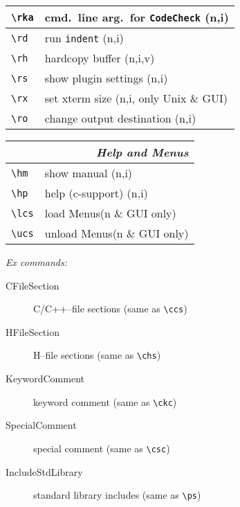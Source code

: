 \documentclass[oneside,11pt,landscape,DIV16]{scrartcl}
\begin{document}
\begin{multicols}{3}
\begin{center}
\begin{tabular}[]{|p{12mm}|p{62mm}|}
\hline \verb'\rka' & cmd.\ line arg.\ for \texttt{CodeCheck} \hfill (n,i)\\
%
\hline \verb'\rd'  & run \texttt{indent}         \hfill (n,i)\\
\hline \verb'\rh'  & hardcopy buffer             \hfill (n,i,v)\\
\hline \verb'\rs'  & show plugin settings        \hfill (n,i)\\
\hline \verb'\rx'  & set xterm size              \hfill (n,i, only Unix \& GUI)\\
\hline \verb'\ro'  & change output destination   \hfill (n,i)\\
\hline
\end{tabular}
%
\begin{tabular}[]{|p{12mm}|p{52mm}|}
\hline
\multicolumn{2}{|r|}{\textsl{\textbf{H}elp and Menus}}\\
\hline \verb'\hm'   & show manual   \hfill (n,i)\\
\hline \verb'\hp'   & help (c-support) \hfill (n,i)\\
\hline \verb'\lcs'  & load    Menus\hfill \scriptsize{(n \& GUI only)}\\
\hline \verb'\ucs'  & unload  Menus\hfill \scriptsize{(n \& GUI only)}\\
\hline 
\end{tabular}
%
%
\begin{minipage}[b]{66mm}%
\vspace{10mm}
%
\begin{flushleft}
%
\textit{Ex commands:}
\begin{description}
%
\item [CFileSection] 
C/C++--file sections (same as \verb'\ccs')
%
\item [HFileSection]
H--file sections (same as \verb'\chs')
%
\item [KeywordComment] 
keyword comment (same as \verb'\ckc')
%
\item [SpecialComment] 
special comment (same as \verb'\csc')
%
\item [IncludeStdLibrary] 
standard library includes (same as \verb'\ps')

\end{description}
\end{flushleft}
\end{minipage}
\end{center}
\end{multicols}
\end{document}
